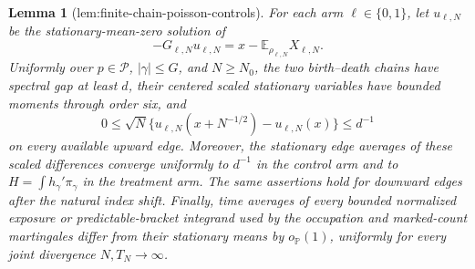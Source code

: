 \documentclass{article}
\newtheorem{lemma}{Lemma}
\begin{document}
\begin{lemma}[lem:finite-chain-poisson-controls]\label{lem:finite-chain-poisson-controls}
For each arm \(\ell\in\{0,1\}\), let \(u_{\ell,N}\) be the stationary-mean-zero solution of
\[
 -G_{\ell,N}u_{\ell,N}=x-\mathbb E_{\rho_{\ell,N}}X_{\ell,N}.
\]
Uniformly over \(p\in\mathcal P\), \(|\gamma|\leq G\), and \(N\geq N_0\), the two birth--death chains have spectral gap at least \(d\), their centered scaled stationary variables have bounded moments through order six, and
\[
 0\leq \sqrt N\{u_{\ell,N}(x+N^{-1/2})-u_{\ell,N}(x)\}\leq d^{-1}
\]
on every available upward edge.  Moreover, the stationary edge averages of these scaled differences converge uniformly to \(d^{-1}\) in the control arm and to \(H=\int h_\gamma'\pi_\gamma\) in the treatment arm.  The same assertions hold for downward edges after the natural index shift.  Finally, time averages of every bounded normalized exposure or predictable-bracket integrand used by the occupation and marked-count martingales differ from their stationary means by \(o_{\mathbb P}(1)\), uniformly for every joint divergence \(N,T_N\to\infty\).
\end{lemma}
\end{document}
